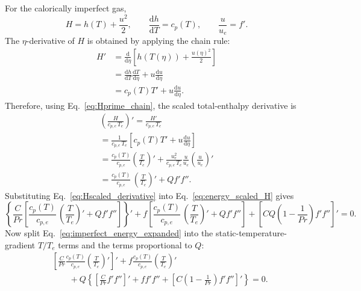 \documentclass[11pt]{article}
\newcommand{\dd}{\mathrm{d}}
\newcommand{\ue}{u_e}
\newcommand{\Te}{T_e}
\newcommand{\cpe}{c_{p,e}}
\begin{document}
For the calorically imperfect gas,
\begin{equation}
  H=h(T)+\frac{u^2}{2},
  \qquad
  \frac{\dd h}{\dd T}=c_p(T),
  \qquad
  \frac{u}{\ue}=f'.
  \label{eq:imperfect_enthalpy_def}
\end{equation}
The \(\eta\)-derivative of \(H\) is obtained by applying the chain rule:
\begin{align}
  H'
  &=
  \frac{\dd}{\dd\eta}
  \left[
    h(T(\eta))+\frac{u(\eta)^2}{2}
  \right]
  \nonumber\\
  &=
  \frac{\dd h}{\dd T}\frac{\dd T}{\dd\eta}
  +
  u\frac{\dd u}{\dd\eta}
  \nonumber\\
  &=
  c_p(T)T'
  +
  u\frac{\dd u}{\dd\eta}.
  \label{eq:Hprime_chain}
\end{align}
Therefore, using Eq.~\eqref{eq:Hprime_chain}, the scaled total-enthalpy derivative is
\begin{align}
  \left(\frac{H}{\cpe\,\Te}\right)'
  =
  \frac{H'}{\cpe\,\Te}
  \nonumber\\
  =
  \frac{1}{\cpe\,\Te}
  \left[
    c_p(T)T'
    +
    u\frac{\dd u}{\dd\eta}
  \right]
  \nonumber\\
  =
  \frac{c_p(T)}{\cpe}
  \left(\frac{T}{\Te}\right)'
  +
  \frac{\ue^2}{\cpe\,\Te}
  \frac{u}{\ue}
  \left(\frac{u}{\ue}\right)'
  \nonumber\\
  =
  \frac{c_p(T)}{\cpe}\,\left(\frac{T}{\Te}\right)'
  +
  Qf'f''.
  \label{eq:Hscaled_derivative}
\end{align}
Substituting Eq.~\eqref{eq:Hscaled_derivative} into Eq.~\eqref{eq:energy_scaled_H} gives
\begin{equation}
  \left\{
    \frac{C}{Pr}
    \left[
      \frac{c_p(T)}{\cpe}\,\left(\frac{T}{\Te}\right)'
      +
      Qf'f''
    \right]
  \right\}'
  +
  f\left[
    \frac{c_p(T)}{\cpe}\,\left(\frac{T}{\Te}\right)'
    +
    Qf'f''
  \right]
  +
  \left[
    CQ\left(1-\frac{1}{Pr}\right)f'f''
  \right]'=0.
  \label{eq:imperfect_energy_expanded}
\end{equation}
Now split Eq.~\eqref{eq:imperfect_energy_expanded} into the static-temperature-gradient \(T/T_e\) terms and the terms proportional to \(Q\):
\begin{align}
  &
  \left[
    \frac{C}{Pr}
    \frac{c_p(T)}{\cpe}
    \left(\frac{T}{\Te}\right)'
  \right]'
  +
  f\frac{c_p(T)}{\cpe}
  \left(\frac{T}{\Te}\right)'
  \nonumber\\
  &\qquad
  +
  Q\left\{
    \left[\frac{C}{Pr}f'f''\right]'
    +
    ff'f''
    +
    \left[C\left(1-\frac{1}{Pr}\right)f'f''\right]'
  \right\}
  =
  0.
  \label{eq:imperfect_energy_split}
\end{align}
\end{document}
